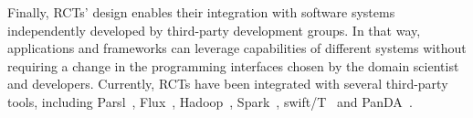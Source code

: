 \documentclass[preprint,12pt, a4paper]{elsarticle}
\begin{document}


Finally, RCTs' design enables their integration with software systems
independently developed by third-party development groups. In that way,
applications and frameworks can leverage capabilities of different systems
without requiring a change in the programming interfaces chosen by the domain
scientist and developers. Currently, RCTs have been integrated with several
third-party tools, including Parsl~\cite{alsaadi2022radical},
Flux~\cite{rp-flux-url}, Hadoop~\cite{luckow2016hadoop},
Spark~\cite{paraskevakos2018task}, swift/T~\cite{turilli2016integrating} and
PanDA~\cite{merzky2019panda}.


\end{document}
